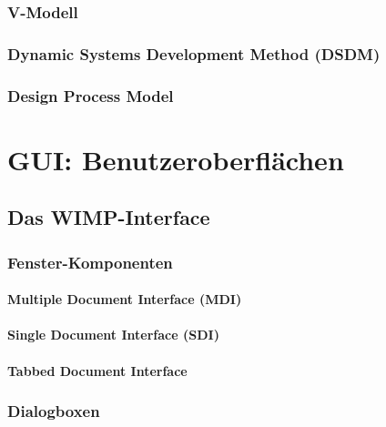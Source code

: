 \documentclass[a4paper, 11pt, accentcolor = tud3b]{tudreport}
\begin{document}
				\subsubsection{V-Modell} %

				\subsubsection{Dynamic Systems Development Method (DSDM)} %

				\subsubsection{Design Process Model} %

		\section{GUI: Benutzeroberflächen} %

			\subsection{Das WIMP-Interface} %

				\subsubsection{Fenster-Komponenten} %

					\paragraph{Multiple Document Interface (MDI)} %

					\paragraph{Single Document Interface (SDI)} %

					\paragraph{Tabbed Document Interface} %

				\subsubsection{Dialogboxen} %
\end{document}
